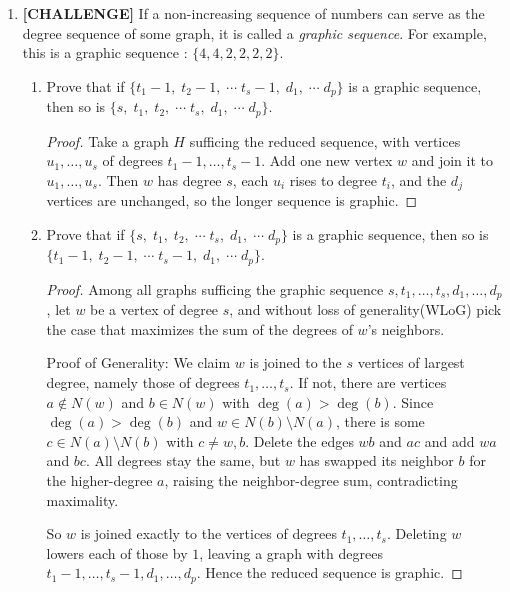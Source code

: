 \documentclass[11pt]{article}
\theoremstyle{solstyle}
\begin{document}
\begin{enumerate}[leftmargin=*]
\begin{proof}
Fix a vertex $u$. It has $3$ neighbors, and each neighbor has at most $2$ other neighbors, so with diameter $2$ every vertex is $u$, a neighbor, or a neighbor of a neighbor: at most $1+3+3\cdot 2=10$ vertices. Graph XIII is $3$-regular with diameter $2$ on exactly $10$ vertices, so the bound is attained.
\end{proof}

\item \textbf{[CHALLENGE]} If a non-increasing sequence of numbers can serve as the degree sequence of some graph, it is called a \emph{graphic sequence}. For example, this is a graphic sequence : $\{4, 4, 2, 2, 2, 2\}$.

\begin{enumerate}[label=(\alph*),leftmargin=*]

\item Prove that if $\{t_1-1,\; t_2-1,\; \cdots\; t_s-1,\; d_1,\; \cdots\; d_p\}$ is a graphic sequence, then so is $\{s,\; t_1,\; t_2,\; \cdots\; t_s,\; d_1,\; \cdots\; d_p\}$.

\begin{proof}
Take a graph $H$ sufficing the reduced sequence, with vertices $u_1,\dots,u_s$ of degrees $t_1-1,\dots,t_s-1$. Add one new vertex $w$ and join it to $u_1,\dots,u_s$. Then $w$ has degree $s$, each $u_i$ rises to degree $t_i$, and the $d_j$ vertices are unchanged, so the longer sequence is graphic.
\end{proof}

\item Prove that if $\{s,\; t_1,\; t_2,\; \cdots\; t_s,\; d_1,\; \cdots\; d_p\}$ is a graphic sequence, then so is $\{t_1-1,\; t_2-1,\; \cdots\; t_s-1,\; d_1,\; \cdots\; d_p\}$.

\begin{proof}
Among all graphs sufficing the graphic sequence $s, t_1, \dots, t_s, d_1, \dots, d_p$, let $w$ be a vertex of degree $s$, and without loss of generality(WLoG) pick the case that maximizes the sum of the degrees of $w$'s neighbors.

Proof of Generality: We claim $w$ is joined to the $s$ vertices of largest degree, namely those of degrees $t_1,\dots,t_s$. If not, there are vertices $a\notin N(w)$ and $b\in N(w)$ with $\deg(a)>\deg(b)$. Since $\deg(a)>\deg(b)$ and $w\in N(b)\setminus N(a)$, there is some $c\in N(a)\setminus N(b)$ with $c\ne w,b$. Delete the edges $wb$ and $ac$ and add $wa$ and $bc$. All degrees stay the same, but $w$ has swapped its neighbor $b$ for the higher-degree $a$, raising the neighbor-degree sum, contradicting maximality.

So $w$ is joined exactly to the vertices of degrees $t_1,\dots,t_s$. Deleting $w$ lowers each of those by $1$, leaving a graph with degrees $t_1-1,\dots,t_s-1,d_1,\dots,d_p$. Hence the reduced sequence is graphic.
\end{proof}

\end{enumerate}

\end{enumerate}
\end{document}
